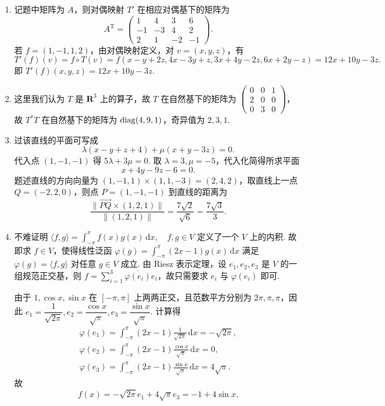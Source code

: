 \begin{enumerate}
    由于 $T^2 \neq O$，$T^3 = O$，故 $T$ 的极小多项式为 $x^3$，Jordan 标准形为 $J_3(0)$.

    \item 记题中矩阵为 $A$，则对偶映射 $T'$ 在相应对偶基下的矩阵为
    \[
        A^{\mathrm{T}}=
        \begin{pmatrix}
        1&4&3&6\\
        -1&-3&4&2\\
        2&1&-2&-1
        \end{pmatrix}.
    \]
    若 $f=(1,-1,1,2)$，由对偶映射定义，对 $v=(x,y,z)$，有
    \[
        T'(f)(v) = f \circ T(v) = f(x-y+2z, 4x-3y+z, 3x+4y-2z, 6x+2y-z) = 12x+10y-3z.
    \]
    即 $T'(f)(x,y,z)=12x+10y-3z$.

    \item 这里我们认为 $T$ 是 $\mathbf{R}^3$ 上的算子，故 $T$ 在自然基下的矩阵为 $\begin{pmatrix}
        0 & 0 & 1 \\ 2 & 0 & 0 \\ 0 & 3 & 0
    \end{pmatrix}$，故 $T^*T$ 在自然基下的矩阵为 $\operatorname{diag}(4, 9, 1)$，奇异值为 $2,3,1$.

    \item 过该直线的平面可写成
    \[
        \lambda(x-y+z+4)+\mu(x+y-3z)=0.
    \]
    代入点 $(1,-1,-1)$ 得 $5\lambda+3\mu=0$. 取 $\lambda=3,\mu=-5$，代入化简得所求平面
    \[
        x+4y-9z-6=0.
    \]
    题述直线的方向向量为 $(1,-1,1) \times (1,1,-3)=(2,4,2)$，取直线上一点 $Q=(-2,2,0)$，则点 $P=(1,-1,-1)$ 到直线的距离为
    \[
        \frac{\|\overrightarrow{PQ}\times(1,2,1)\|}{\|(1,2,1)\|}
        =\frac{7\sqrt{2}}{\sqrt{6}}
        =\frac{7\sqrt{3}}{3}.
    \]

    \item 不难证明 $\langle f, g \rangle = \displaystyle\int_{-\pi}^{\pi} f(x)g(x)\,\mathrm{d}x, \quad f, g \in V$ 定义了一个 $V$ 上的内积. 故即求 $f \in V$，使得线性泛函 $\varphi(g) = \displaystyle\int_{-\pi}^{\pi} (2x-1)g(x)\,\mathrm{d}x$ 满足 $\varphi(g) = \langle f, g \rangle$ 对任意 $g \in V$ 成立. 由 Riesz 表示定理，设 $e_1, e_2, e_3$ 是 $V$ 的一组规范正交基，则 $f = \displaystyle\sum_{i=1}^3 \overline{\varphi(e_i)} e_i$，故只需要求 $e_i$ 与 $\varphi(e_i)$ 即可.

    由于 $1,\cos x,\sin x$ 在 $[-\pi,\pi]$ 上两两正交，且范数平方分别为 $2\pi,\pi,\pi$，因此 $e_1=\dfrac{1}{\sqrt{2\pi}}, e_2=\dfrac{\cos x}{\sqrt{\pi}}, e_3=\dfrac{\sin x}{\sqrt{\pi}}$. 计算得
    \begin{gather*}
        \varphi(e_1) = \int_{-\pi}^{\pi} (2x-1)\frac{1}{\sqrt{2\pi}}\,\mathrm{d}x=-\sqrt{2\pi},\\
        \varphi(e_2) = \int_{-\pi}^{\pi} (2x-1)\frac{\cos x}{\sqrt{\pi}}\,\mathrm{d}x=0,\\
        \varphi(e_3) = \int_{-\pi}^{\pi} (2x-1)\frac{\sin x}{\sqrt{\pi}}\,\mathrm{d}x=4\sqrt{\pi}.
    \end{gather*}
    故
    \[
        f(x)=-\sqrt{2\pi}e_1+4\sqrt{\pi}e_3=-1+4\sin x.
    \]


\end{enumerate}
